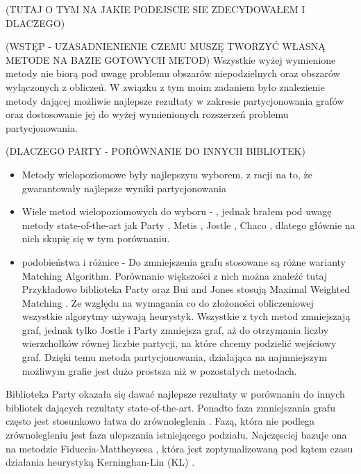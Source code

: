 (TUTAJ O TYM NA JAKIE PODEJSCIE SIE ZDECYDOWAŁEM I DLACZEGO)

(WSTĘP - UZASADNIENIENIE CZEMU MUSZĘ TWORZYĆ WŁASNĄ METODE NA BAZIE GOTOWYCH METOD)
Wszystkie wyżej wymienione metody nie biorą pod uwagę problemu obszarów niepodzielnych oraz obszarów wyłączonych z obliczeń.
W związku z tym moim zadaniem było znalezienie metody dającej możliwie najlepsze rezultaty w zakresie partycjonowania grafów oraz
dostosowanie jej do wyżej wymienionych rozszerzeń problemu partycjonowania.

(DLACZEGO PARTY - PORÓWNANIE DO INNYCH BIBLIOTEK)
\begin{itemize}
    \item {Metody wielopoziomowe były najlepszym wyborem, z racji na to, że gwarantowały najlepsze wyniki partycjonowania}
    \item {Wiele metod wielopoziomowych do wyboru - \cite{metis, jostle, Bui1993AHF, 103500, 185177, 279334, inproceedings, 129970, 10.1145/165939.165942},
        jednak brałem pod uwagę metody state-of-the-art jak Party \cite{1364754}, Metis \cite{metis}, Jostle \cite{jostle}, Chaco \cite{inproceedings},
        dlatego głównie na nich skupię się w tym porównaniu.}
    \item {podobieństwa i różnice -  Do zmniejszenia grafu stosowane są różne warianty Matching Algorithm.
    Porównanie większości z nich można znaleźć tutaj \cite{Analysis}
    Przykładowo biblioteka Party \cite{1364754} oraz Bui and Jones \cite{Bui1993AHF} stosują Maximal Weighted Matching \cite{weighted_maching}.
    Ze względu na wymagania co do złożoności obliczeniowej wszystkie algorytmy używają heurystyk.
    Wszystkie z tych metod zmniejszają graf, jednak tylko Jostle i Party zmniejsza graf,
    aż do otrzymania liczby wierzchołków równej liczbie partycji, na które chcemy podzielić wejściowy graf.
    Dzięki temu metoda partycjonowania, działająca na najmniejszym możliwym grafie jest dużo prostsza niż w pozostałych metodach.}
\end{itemize}

Biblioteka Party \cite{1364754} okazała się dawać najlepsze rezultaty w porównaniu do innych bibliotek dających rezultaty
state-of-the-art.
Ponadto faza zmniejszania grafu często jest stosunkowo łatwa do zrównoleglenia \cite{KARYPIS199871}. Fazą, która nie podlega
zrównolegleniu jest faza ulepszania istniejącego podziału.
Najczęsciej bazuje ona na metodzie Fiduccia-Mattheysesa \cite{10.5555/800263.809204},
która jest zoptymalizowaną pod kątem czasu działania heurystyką Kerninghan-Lin (KL) \cite{6771089}.




